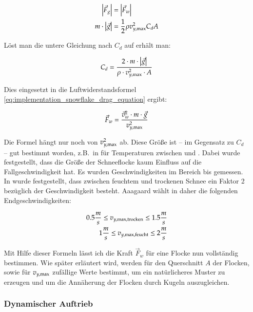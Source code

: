 \begin{align}
\left|\vec{F}_g\right| &= \left|\vec{F}_w\right| \\
m \cdot \left|\vec{g}\right| &= \frac{1}{2} \rho v_{y,\textnormal{max}}^2 C_d A
\end{align}

Löst man die untere Gleichung nach $C_d$ auf erhält man:

\begin{equation}
C_d
=
\frac
{
  2 \cdot m \cdot \left|\vec{g}\right|
}
{
  \rho \cdot v_{y,\textnormal{max}}^2 \cdot A
}
\end{equation}

Dies eingesetzt in die Luftwiderstandsformel
\ref{eq:implementation_snowflake_drag_equation} ergibt:

\begin{equation}
\vec{F}_w =
\frac
{
  \vec{v}_w^2 \cdot m \cdot \vec{g}
}
{
  v_{y,\textnormal{max}}^2
}
\end{equation}

Die Formel hängt nur noch von $v_{y,\textnormal{max}}^2$
ab. Diese Größe ist -- im Gegensatz zu $C_d$ -- gut bestimmt worden,
z.B.\ in \cite{Hanesch1966} für Temperaturen zwischen 
und . Dabei wurde festgestellt,
dass die Größe der Schneeflocke kaum Einfluss auf die
Fallgeschwindigkeit hat. Es wurden Geschwindigkeiten im Bereich 
bis  gemessen. In
\cite{Centre1998} wurde festgestellt, dass zwischen feuchtem und
trockenen Schnee ein Faktor 2 bezüglich der Geschwindigkeit
besteht. Aaagaard wählt in \cite{Aagaard2004} daher die folgenden
Endgeschwindigkeiten:

\begin{align}
0.5 \frac{m}{s} \leq v_{y,\textnormal{max},\textnormal{trocken}} \leq 1.5 \frac{m}{s} \\
1 \frac{m}{s} \leq v_{y,\textnormal{max},\textnormal{feucht}} \leq 2 \frac{m}{s}
\end{align}

Mit Hilfe dieser Formeln lässt ich die Kraft $\vec{F}_w$ für eine
Flocke nun vollständig bestimmen. Wie später erläutert wird, werden
für den Querschnitt $A$ der Flocken, sowie für
$v_{y,\textnormal{max}}$ zufällige Werte bestimmt, um ein
natürlicheres Muster zu erzeugen und um die Annäherung der Flocken
durch Kugeln auszugleichen.

\subsubsection{Dynamischer Auftrieb}

